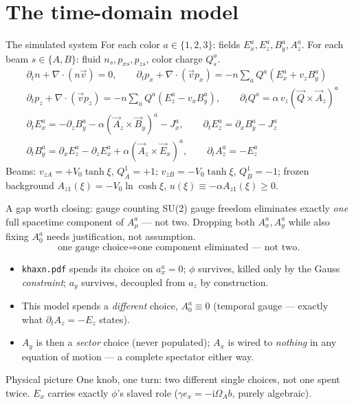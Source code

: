 \documentclass[aspectratio=169,11pt]{beamer}
\newenvironment{physpicture}{\begin{exampleblock}{Physical picture}}{\end{exampleblock}}
\newcommand{\Vo}{V_0}
\newcommand{\OmA}{\Omega_A}
\newcommand{\Az}{A_{z1}}
\newcommand{\ii}{\mathrm{i}}
\begin{document}
\section{The time-domain model}

\begin{frame}{The simulated system}
For each color $a\in\{1,2,3\}$: fields $E_x^a,E_z^a,B_y^a,A_z^a$. For each beam
$s\in\{A,B\}$: fluid $n_s,p_{xs},p_{zs}$, color charge $Q_s^a$.
\vspace{0.05em}
\begin{align*}
&\partial_t n+\nabla\!\cdot(n\vec v)=0, \qquad
\partial_t p_x+\nabla\!\cdot(\vec v p_x)=-n\textstyle\sum_a Q^a(E_x^a+v_zB_y^a)\\
&\partial_t p_z+\nabla\!\cdot(\vec v p_z)=-n\textstyle\sum_a Q^a(E_z^a-v_xB_y^a),\qquad
\partial_t Q^a=\alpha\,v_z(\vec Q\times\vec A_z)^a\\[0.3em]
&\partial_t E_x^a=-\partial_zB_y^a-\alpha(\vec A_z\times\vec B_y)^a-J_x^a,\qquad
\partial_t E_z^a=\partial_xB_y^a-J_z^a\\
&\partial_t B_y^a=\partial_xE_z^a-\partial_zE_x^a+\alpha(\vec A_z\times\vec E_x)^a,
\qquad \partial_t A_z^a=-E_z^a
\end{align*}
Beams: $v_{zA}=+\Vo\tanh\xi$, $Q^1_A=+1$; $v_{zB}=-\Vo\tanh\xi$, $Q^1_B=-1$; frozen
background $\Az(\xi)=-\Vo\ln\cosh\xi$, $u(\xi)\equiv-\alpha\Az(\xi)\ge0$.
\end{frame}

\begin{frame}{A gap worth closing: gauge counting}
\footnotesize
SU(2) gauge freedom eliminates exactly \emph{one} full spacetime component of
$A_\mu^a$ — not two. Dropping both $A_x^a,A_y^a$ while also fixing $A_0^a$ needs
justification, not assumption.
\[
\boxed{\text{one gauge choice}\Rightarrow\text{one component eliminated --- not two.}}
\]
\begin{itemize}
\item \texttt{khaxn.pdf} spends its choice on $a_x^a=0$; $\phi$ survives, killed
only by the Gauss \emph{constraint}; $a_y$ survives, decoupled from $a_z$ by
construction.
\item This model spends a \emph{different} choice, $A_0^a\equiv0$ (temporal
gauge — exactly what $\partial_tA_z=-E_z$ states).
\item $A_y$ is then a \emph{sector} choice (never populated); $A_x$ is wired to
\emph{nothing} in any equation of motion — a complete spectator either way.
\end{itemize}
\begin{physpicture}
One knob, one turn: two different single choices, not one spent twice. $E_x$
carries exactly $\phi$'s slaved role ($\gamma e_x=-\ii\OmA b$, purely algebraic).
\end{physpicture}
\end{frame}
\end{document}
